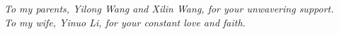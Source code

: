\chapter*{~}


\begin{center}                  %
\vspace*{3in}                   %
    \begin{onehalfspacing}      %
    \textit{
      To my parents, Yilong Wang and Xilin Wang, for your unwavering support. \\To my wife, Yinuo Li, for your constant love and faith.
    }
\end{onehalfspacing}
\end{center}

